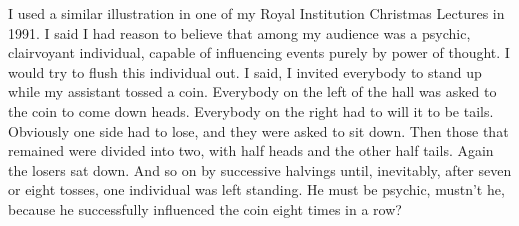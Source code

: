 I used a similar illustration in one of my Royal
Institution Christmas Lectures in 1991. I said I had reason
to believe that among my audience was a psychic,
clairvoyant individual, capable of influencing events
purely by power of thought. I would try to flush this
individual out.  I said,
 I invited everybody to
stand up while my assistant tossed a coin. Everybody on the
left of the hall was asked to  the coin to
come down heads. Everybody on the right had to will it to be
tails. Obviously one side had to lose, and they were asked
to sit down. Then those that remained were divided into two,
with half  heads and the other half tails.
Again the losers sat down. And so on by successive halvings
until, inevitably, after seven or eight tosses, one
individual was left standing.  He must be psychic, mustn't he,
because he successfully influenced the coin eight times in
a row?
